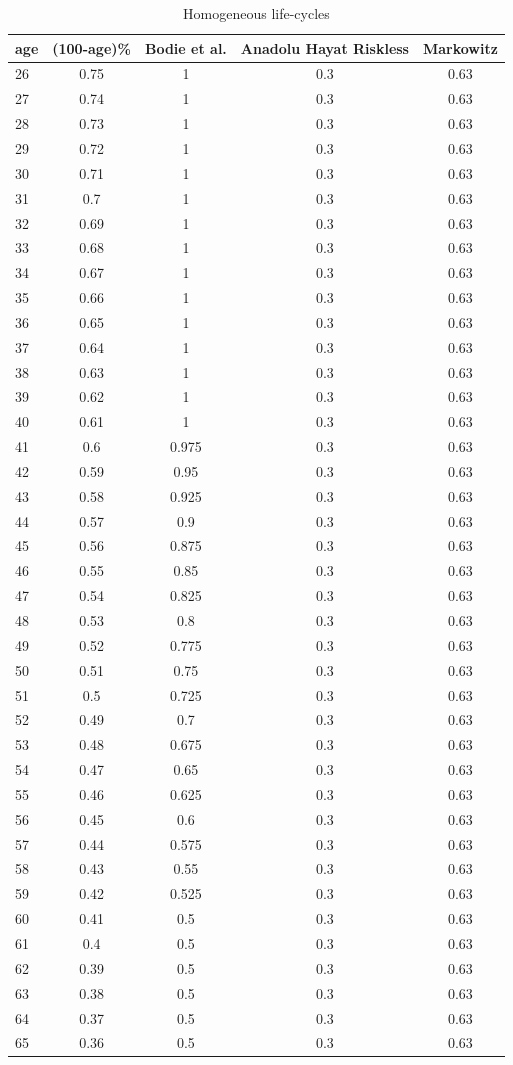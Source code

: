 \documentclass[]{elsarticle}
\begin{document}
\begin{appendix}
\begin{table}[H]
	\centering
	\caption[]{Homogeneous life-cycles}
	\begin{tabular}[c]{lcccc}
		\hline
		age&(100-age)\%&Bodie et al.&Anadolu Hayat Riskless&Markowitz\\
		\hline
		26&0.75&1&0.3&0.63\\
		27&0.74&1&0.3&0.63\\
		28&0.73&1&0.3&0.63\\
		29&0.72&1&0.3&0.63\\
		30&0.71&1&0.3&0.63\\
		31&0.7&1&0.3&0.63\\
		32&0.69&1&0.3&0.63\\
		33&0.68&1&0.3&0.63\\
		34&0.67&1&0.3&0.63\\
		35&0.66&1&0.3&0.63\\
		36&0.65&1&0.3&0.63\\
		37&0.64&1&0.3&0.63\\
		38&0.63&1&0.3&0.63\\
		39&0.62&1&0.3&0.63\\
		40&0.61&1&0.3&0.63\\
		41&0.6&0.975&0.3&0.63\\
		42&0.59&0.95&0.3&0.63\\
		43&0.58&0.925&0.3&0.63\\
		44&0.57&0.9&0.3&0.63\\
		45&0.56&0.875&0.3&0.63\\
		46&0.55&0.85&0.3&0.63\\
		47&0.54&0.825&0.3&0.63\\
		48&0.53&0.8&0.3&0.63\\
		49&0.52&0.775&0.3&0.63\\
		50&0.51&0.75&0.3&0.63\\
		51&0.5&0.725&0.3&0.63\\
		52&0.49&0.7&0.3&0.63\\
		53&0.48&0.675&0.3&0.63\\
		54&0.47&0.65&0.3&0.63\\
		55&0.46&0.625&0.3&0.63\\
		56&0.45&0.6&0.3&0.63\\
		57&0.44&0.575&0.3&0.63\\
		58&0.43&0.55&0.3&0.63\\
		59&0.42&0.525&0.3&0.63\\
		60&0.41&0.5&0.3&0.63\\
		61&0.4&0.5&0.3&0.63\\
		62&0.39&0.5&0.3&0.63\\
		63&0.38&0.5&0.3&0.63\\
		64&0.37&0.5&0.3&0.63\\
		65&0.36&0.5&0.3&0.63\\
		\hline
	\end{tabular}
\end{table}


\end{appendix}
\end{document}
